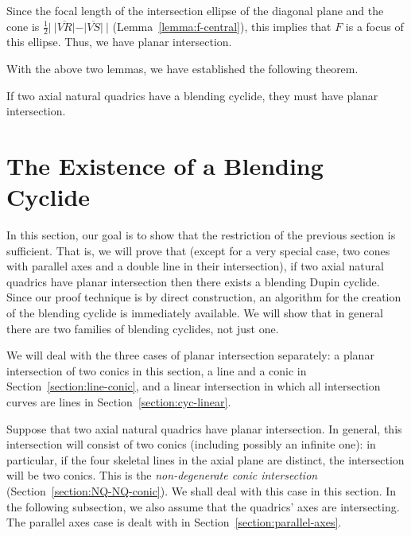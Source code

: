      Since the focal length of the intersection ellipse of the diagonal plane
and the cone is $\frac{1}{2}|\ |\overline{VR}|-|\overline{VS}|\ |$
(Lemma~\ref{lemma:f-central}), this implies that $F$ is a focus of this 
ellipse.  Thus, we have planar intersection. \QED

     With the above two lemmas, we have established the following theorem.

\begin{theorem}
\label{thm:cyclide->planar}
     If two axial natural quadrics have a blending cyclide, they must
have planar intersection.
\end{theorem}


\section{The Existence of a Blending Cyclide}
\label{section:cyclide-non-degen}

     In this section, our goal is to show that the restriction of the previous
section is sufficient.  That is, we will prove that (except for a very special
case, two cones with parallel axes and a double line in their intersection),
if two axial natural quadrics have planar intersection then there exists 
a blending Dupin cyclide.  Since our proof technique is by direct construction,
an algorithm for the creation of the blending cyclide is immediately available.
We will show that in general there are two families of blending cyclides, not
just one.

     We will deal with the three cases of planar intersection separately:
a planar intersection of two conics in this section, a line and a conic in
Section~\ref{section:line-conic}, and a linear intersection in which all 
intersection curves are lines in Section~\ref{section:cyc-linear}.

     Suppose that two axial natural quadrics have planar intersection.  In
general, this intersection will consist of two conics (including possibly an
infinite one): in particular, if the four skeletal lines in the axial plane
are distinct, the intersection will be two conics.  This is the 
{\em non-degenerate conic intersection}
(Section~\ref{section:NQ-NQ-conic}).
We shall deal with this case in this section.  In the following subsection, 
we also assume that the quadrics' axes are intersecting.  The parallel axes 
case is dealt with in Section~\ref{section:parallel-axes}.

